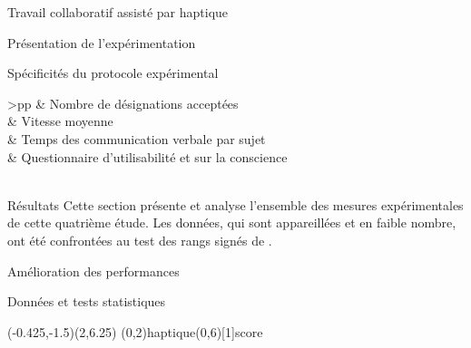 \documentclass[myfrancais,ngerman,english,french]{mythesis}
\begin{document}
\begin{mychapter}{Travail collaboratif assisté par haptique}
\begin{mysection}{Présentation de l'expérimentation}
\begin{mysubsection}{Spécificités du protocole expérimental}
\begin{mytable}
\begin{mytabular}{>{\bfseries}p{\expfourfirstcolumn}p{\expfoursecondcolumn}}
						                                           &  Nombre de désignations acceptées                        \\
						                                           &  Vitesse moyenne                                         \\
						                                           &  Temps des communication verbale par sujet               \\
						                                           &  Questionnaire d'utilisabilité et sur la conscience     \\
						\mymiddlerule[\heavyrulewidth]
						 \\
						\mybottomrule
					\end{mytabular}
				\end{mytable}
			\end{mysubsection}
		\end{mysection}
		\begin{mysection}{Résultats}
			Cette section présente et analyse l'ensemble des mesures expérimentales de cette quatrième étude.
			Les données, qui sont appareillées et en faible nombre, ont été confrontées au test des rangs signés de .
			\begin{mysubsection}{Amélioration des performances}
				\begin{mysubsubsection}{Données et tests statistiques}
					\begin{myfigure}
						\begin{myps}(-0.425,-1.5)(2,6.25)
							\myaxes(0,2){haptique}(0,6)[1]{score }

\end{myps}
\end{myfigure}
\end{mysubsubsection}
\end{mysubsection}
\end{mysection}
\end{mychapter}
\end{document}
